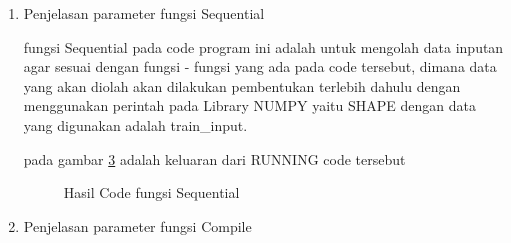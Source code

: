 \begin{enumerate}
\begin{figure}[!htbp]
      \caption{Hasil Code Program training\_split}
      \label{f13}
\end{figure}

\subitem dan berikut ini adalah hasil akhir dari data yang telah dipisahkan menjadi data TEST dan TRAIN dengan data tersebut sudah dilakukan SHUFFLE (acak) terdapat pada gambar \ref{f14}.

\begin{figure}[!htbp]
      \caption{Hasil Code Program training\_split}
      \label{f14}
\end{figure}

\item Penjelasan parameter fungsi Sequential



\subitem fungsi Sequential pada code program ini adalah untuk mengolah data inputan agar sesuai dengan fungsi - fungsi yang ada pada code tersebut, dimana data yang akan diolah akan dilakukan pembentukan terlebih dahulu dengan menggunakan perintah pada Library NUMPY yaitu SHAPE dengan data yang digunakan adalah train\_input.

\subitem pada gambar \ref{f15} adalah keluaran dari RUNNING code tersebut

\begin{figure}[!htbp]
      \caption{Hasil Code fungsi Sequential}
      \label{f15}
\end{figure}

\item Penjelasan parameter fungsi Compile




\end{enumerate}
